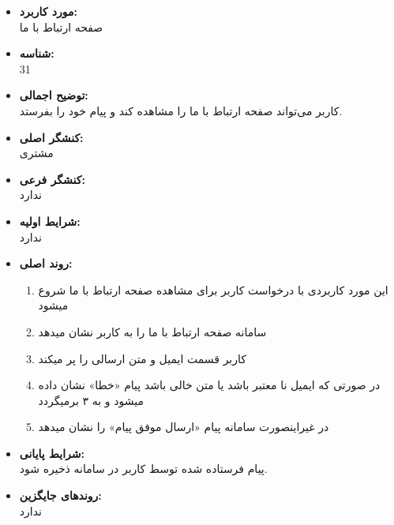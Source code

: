 \documentclass{article}
\begin{document}
\begin{itemize}
\item \textbf{مورد کاربرد:}\\
صفحه ارتباط با ما
\item \textbf{شناسه:}\\
31
\item \textbf{توضیح اجمالی:}\\
کاربر می‌تواند صفحه ارتباط با ما را مشاهده کند و پیام خود را بفرستد.
\item \textbf{کنشگر اصلی:}\\
مشتری
\item \textbf{کنشگر فرعی:}\\
ندارد
\item \textbf{شرایط اولیه:}\\
ندارد
\item \textbf{روند اصلی:}\\
\begin{enumerate}
\item  این مورد کاربردی با درخواست کاربر برای مشاهده صفحه ارتباط با ما شروع میشود
\item سامانه صفحه ارتباط با ما را به کاربر نشان میدهد
\item کاربر قسمت ایمیل و متن ارسالی را پر میکند
\item در صورتی که ایمیل نا معتبر باشد یا متن خالی باشد پیام «خطا» نشان داده میشود و به ۳ برمیگردد
\item در غیراینصورت سامانه پیام «ارسال موفق پیام» را نشان میدهد
\end{enumerate}
\item \textbf{شرایط پایانی:}\\ 
پیام فرستاده شده توسط کاربر در سامانه ذخیره شود.
\item \textbf{روندهای جایگزین:}\\
ندارد
\end{itemize}
\noindent\makebox[\linewidth]{\rule{\paperwidth}{0.4pt}}
\end{document}
